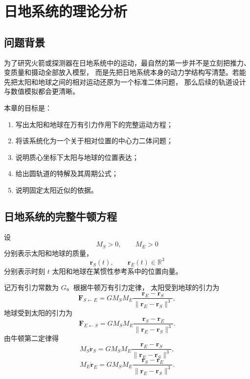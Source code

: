 \chapter{日地系统的理论分析}

\section{问题背景}

为了研究火箭或探测器在日地系统中的运动，最自然的第一步并不是立刻把推力、变质量和摄动全部放入模型，
而是先把日地系统本身的动力学结构写清楚。若能先把太阳和地球之间的相对运动还原为一个标准二体问题，
那么后续的轨道设计与数值模拟都会更清晰\cite{MurrayDermott1999,BateMuellerWhite1971}。

本章的目标是：
\begin{enumerate}[label=\arabic*.]
  \item 写出太阳和地球在万有引力作用下的完整运动方程；
  \item 将该系统化为一个关于相对位置的中心力二体问题；
  \item 说明质心坐标下太阳与地球的位置表达；
  \item 给出圆轨道的特解及其周期公式；
  \item 说明固定太阳近似的依据。
\end{enumerate}

\section{日地系统的完整牛顿方程}

设
\[
M_S>0,\qquad M_E>0
\]
分别表示太阳和地球的质量，
\[
\bm r_S(t),\qquad \bm r_E(t)\in \mathbb R^3
\]
分别表示时刻 \(t\) 太阳和地球在某惯性参考系中的位置向量。

记万有引力常数为 \(G\)。根据牛顿万有引力定律\cite{MurrayDermott1999,BateMuellerWhite1971}，
太阳受到地球的引力为
\[
\bm F_{S\leftarrow E}
=
G M_S M_E
\frac{\bm r_E-\bm r_S}{\|\bm r_E-\bm r_S\|^3},
\]
地球受到太阳的引力为
\[
\bm F_{E\leftarrow S}
=
G M_S M_E
\frac{\bm r_S-\bm r_E}{\|\bm r_E-\bm r_S\|^3}.
\]
由牛顿第二定律得
\begin{equation}\label{eq:sun-motion}
M_S \ddot{\bm r}_S
=
G M_S M_E
\frac{\bm r_E-\bm r_S}{\|\bm r_E-\bm r_S\|^3},
\end{equation}
\begin{equation}\label{eq:earth-motion}
M_E \ddot{\bm r}_E
=
G M_S M_E
\frac{\bm r_S-\bm r_E}{\|\bm r_E-\bm r_S\|^3}.
\end{equation}

